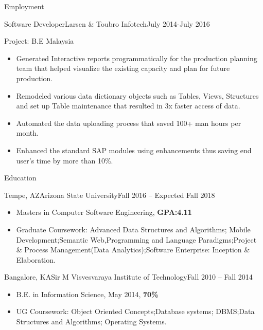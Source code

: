 \documentclass[]{nakulcv}
\begin{document}
	\makeheader
	
	\begin{cvsection}{Employment}
		\begin{cvsubsection}{Software Developer}{Larsen \& Toubro Infotech}{July 2014-July 2016}
		\begin{cvsubsection}{Project: B.E Malaysia}{}{}
				\begin{itemize}
					\item	Generated Interactive reports programmatically for the production planning team that helped visualize the existing capacity and plan for future production.
					\item Remodeled various data dictionary objects such as Tables, Views, Structures and set up Table maintenance that resulted in 3x faster access of data.
					\item Automated the data uploading process that saved 100+ man hours per month.
					\item Enhanced the standard SAP modules using enhancements thus saving end user’s time by more than 10\%.
				\end{itemize}
			\end{cvsubsection}
		\end{cvsubsection}
	\end{cvsection}
		\begin{cvsection}{Education}
		\begin{cvsubsection}{Tempe, AZ}{Arizona State University}{Fall 2016 -- Expected Fall 2018}
			\begin{itemize}
				\item Masters in Computer Software Engineering, \textbf{GPA:4.11}
				\item Graduate Coursework: Advanced Data Structures and Algorithms; Mobile Development;Semantic Web,Programming and Language Paradigms;Project \& Process Management(Data Analytics);Software Enterprise: Inception \& Elaboration.
			\end{itemize}
		\end{cvsubsection}
		\begin{cvsubsection}{Bangalore, KA}{Sir M Visvesvaraya Institute of Technology}{Fall 2010 -- Fall 2014}
			\begin{itemize}
			\item B.E. in Information Science, May 2014, \textbf{70\%}
				\item UG Coursework: Object Oriented Concepts;Database systems; DBMS;Data Structures and Algorithms; Operating Systems.
			\end{itemize}
		\end{cvsubsection}
	\end{cvsection}
\end{document}

